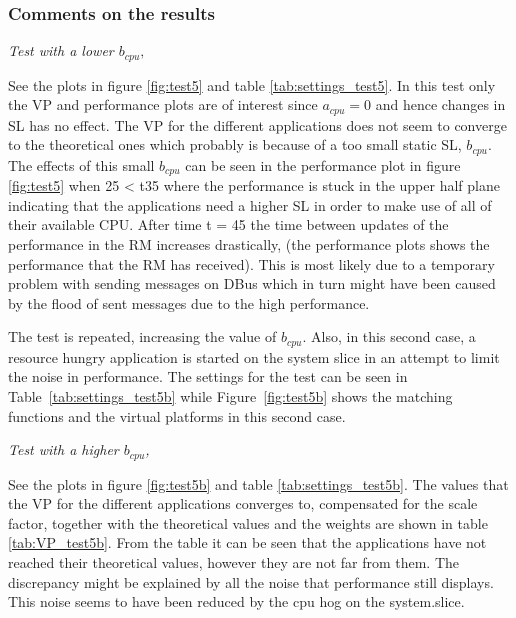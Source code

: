\documentclass[nobiblatex]{LTHthesis}
\begin{document}
\subsubsection{Comments on the results}

\begin{flushleft}
\emph{Test with a lower $b_{cpu},$}
\end{flushleft}
See the plots in figure \ref{fig:test5} and table \ref{tab:settings_test5}.
In this test only the VP and performance plots are of interest since $a_{cpu}=0$ and hence changes in SL has no effect.
The VP for the different applications does not seem to converge to the theoretical ones which probably is because of a too small static SL, $b_{cpu}$.
The effects of this small $b_{cpu}$ can be seen in the performance plot in figure \ref{fig:test5} when 25 < t35 where the performance is stuck in the upper half plane indicating that the applications need a higher SL 
in order to make use of all of their available CPU. After time t = 45 the time between updates of the performance in the RM increases drastically, (the performance plots shows the performance that the RM has received). This is most likely due to a temporary problem with sending messages on DBus which in turn might have been caused by the flood of sent messages due to the high performance.

The test is repeated, increasing the value of $b_{cpu}$. Also, in this
second case, a resource hungry application is started on the system slice 
in an attempt to limit the noise in performance. The settings for the
test can be seen in Table~\ref{tab:settings_test5b} while 
Figure~\ref{fig:test5b} shows the matching functions and the virtual
platforms in this second case.



\begin{flushleft}
\emph{Test with a higher $b_{cpu}$,}
\end{flushleft}
See the plots in figure \ref{fig:test5b} and table \ref{tab:settings_test5b}.
The values that the VP for the different applications converges to, compensated for the scale factor,  together with the theoretical values and the weights are shown in table \ref{tab:VP_test5b}.
From the table it can be seen that the applications have not reached their theoretical values, however they are not far from them.
The discrepancy might be explained by all the noise that performance still displays. This noise seems to have been reduced by the cpu hog on the system.slice.
\end{document}
